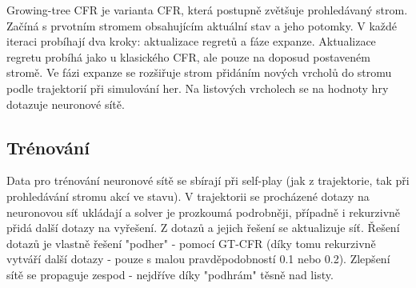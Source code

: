 Growing-tree CFR je varianta CFR, která postupně zvětšuje prohledávaný strom. Začíná s prvotním stromem obsahujícím aktuální stav a jeho potomky.  
V každé iteraci probíhají dva kroky: aktualizace regretů a fáze expanze. Aktualizace regretu probíhá jako u klasického CFR, ale pouze na doposud postaveném stromě. Ve fázi expanze se rozšiřuje strom přidáním nových vrcholů do stromu podle trajektorií při simulování her. 
Na listových vrcholech se na hodnoty hry dotazuje neuronové sítě.

\subsection{Trénování}

Data pro trénování neuronové sítě se sbírají při self-play (jak z trajektorie, tak při prohledávání stromu akcí ve stavu). V trajektorii se procházené dotazy na neuronovou síť ukládají a solver je prozkoumá podrobněji, případně i rekurzivně přidá další dotazy na vyřešení. Z dotazů a jejich řešení se aktualizuje síť. Řešení dotazů je vlastně řešení "podher" - pomocí GT-CFR (díky tomu rekurzivně vytváří další dotazy - pouze s malou pravděpodobností 0.1 nebo 0.2). Zlepšení sítě se propaguje zespod - nejdříve díky "podhrám" těsně nad listy.
